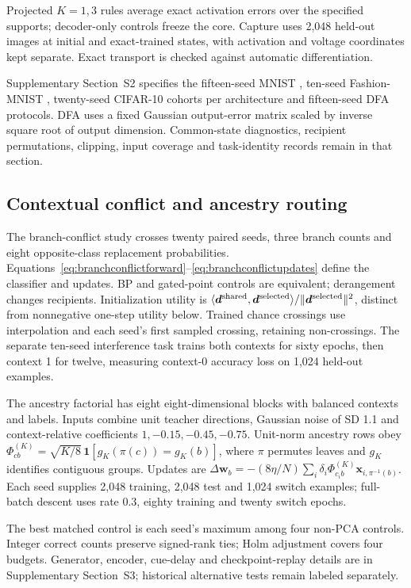 \documentclass[11pt]{article}
\begin{document}
Projected $K=1,3$ rules average exact activation errors over the specified supports; decoder-only controls freeze the core. Capture uses 2,048 held-out images at initial and exact-trained states, with activation and voltage coordinates kept separate. Exact transport is checked against automatic differentiation.

Supplementary Section~S2 specifies the fifteen-seed MNIST \citep{lecun1998mnist}, ten-seed Fashion-MNIST \citep{xiao2017fashionmnist}, twenty-seed CIFAR-10 cohorts per architecture \citep{krizhevsky2009cifar} and fifteen-seed DFA protocols. DFA uses a fixed Gaussian output-error matrix scaled by inverse square root of output dimension. Common-state diagnostics, recipient permutations, clipping, input coverage and task-identity records remain in that section.



\subsection*{Contextual conflict and ancestry routing}

The branch-conflict study crosses twenty paired seeds, three branch counts and eight opposite-class replacement probabilities. Equations~\ref{eq:branchconflictforward}--\ref{eq:branchconflictupdates} define the classifier and updates. BP and gated-point controls are equivalent; derangement changes recipients. Initialization utility is $\langle\bm d^{\rm shared},\bm d^{\rm selected}\rangle/\|\bm d^{\rm selected}\|^2$, distinct from nonnegative one-step utility below. Trained chance crossings use interpolation and each seed's first sampled crossing, retaining non-crossings. The separate ten-seed interference task trains both contexts for sixty epochs, then context 1 for twelve, measuring context-0 accuracy loss on 1,024 held-out examples.

The ancestry factorial has eight eight-dimensional blocks with balanced contexts and labels. Inputs combine unit teacher directions, Gaussian noise of SD 1.1 and context-relative coefficients $1,-0.15,-0.45,-0.75$. Unit-norm ancestry rows obey $\Phi^{(K)}_{cb}=\sqrt{K/8}\,\mathbf1[g_K(\pi(c))=g_K(b)]$, where $\pi$ permutes leaves and $g_K$ identifies contiguous groups. Updates are $\Delta\bm w_b=-(8\eta/N)\sum_i\delta_i\Phi^{(K)}_{c_ib}\bm x_{i,\pi^{-1}(b)}$. Each seed supplies 2,048 training, 2,048 test and 1,024 switch examples; full-batch descent uses rate 0.3, eighty training and twenty switch epochs.

The best matched control is each seed's maximum among four non-PCA controls. Integer correct counts preserve signed-rank ties; Holm adjustment covers four budgets. Generator, encoder, cue-delay and checkpoint-replay details are in Supplementary Section~S3; historical alternative tests remain labeled separately.
\end{document}
